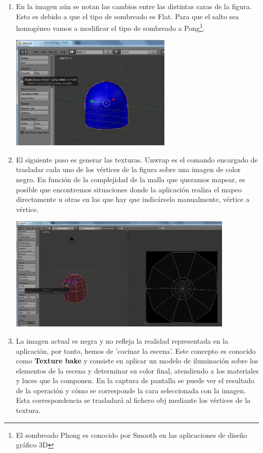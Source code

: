 \begin{enumerate}
\item En la imagen aún se notan las cambios entre las distintas caras de la figura. Esto es debido a que el tipo de sombreado es Flat. Para que el salto sea homogéneo vamos a modificar el tipo de sombreado a Pong\footnote{El sombreado Phong es conocido por Smooth en las aplicaciones de diseño gráfico 3D}.

   \begin{minipage}{\linewidth}
         \centering
          \includegraphics[height=5.5cm]{img/blender/blender7.jpg} 
    \end{minipage}

\item El siguiente paso es generar las texturas. Unwrap es el comando encargado de trasladar cada uno de los vértices de la figura sobre una imagen de color negro. En función de la complejidad de la malla que queramos mapear, es posible que encontremos situaciones donde la aplicación realiza el mapeo directamente u otras en las que hay que indicárselo manualmente, vértice a vértice.

   \begin{minipage}{\linewidth}
         \centering
          \includegraphics[height=5.5cm]{img/blender/blender8.jpg} 
    \end{minipage}

\label{textureBake}\item La imagen actual es negra y no refleja la realidad representada en la aplicación, por tanto, hemos de 'cocinar la escena'. Este concepto es conocido como \textbf{Texture bake} y consiste en aplicar un modelo de iluminación sobre los elementos de la escena y determinar su color final, atendiendo a los materiales y luces que la componen. En la captura de pantalla se puede ver el resultado de la operación y cómo se corresponde la cara seleccionada con la imagen. Esta correspondencia se trasladará al fichero obj mediante los vértices de la textura.


\end{enumerate}
